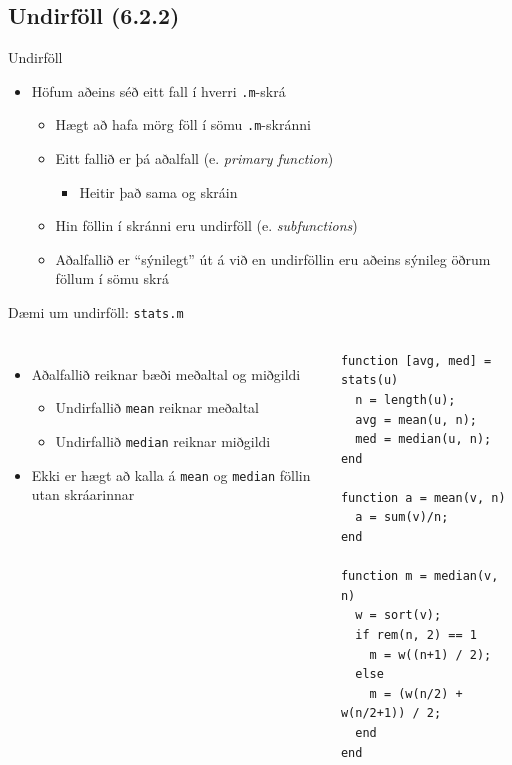 \documentclass[handout]{beamer}
\begin{document}
\subsection{Undirföll (6.2.2)}

\begin{frame}{Undirföll}
\begin{itemize}
 \item Höfum aðeins séð eitt fall í hverri \texttt{.m}-skrá
 \begin{itemize}
  \item Hægt að hafa mörg föll í sömu \texttt{.m}-skránni
  \item Eitt fallið er þá aðalfall (e. \emph{primary function})
  \begin{itemize}
   \item Heitir það sama og skráin
  \end{itemize}
  \item Hin föllin í skránni eru undirföll (e. \emph{subfunctions})
  \item Aðalfallið er ``sýnilegt'' út á við en undirföllin eru aðeins sýnileg öðrum föllum í sömu skrá
 \end{itemize}
\end{itemize}
\end{frame}

\begin{frame}[fragile]{Dæmi um undirföll: \texttt{stats.m}}
\begin{columns}
\begin{itemize}
 \item Aðalfallið reiknar bæði meðaltal og miðgildi
 \begin{itemize}
  \item Undirfallið \texttt{mean} reiknar meðaltal
  \item Undirfallið \texttt{median} reiknar miðgildi
 \end{itemize}
 \item Ekki er hægt að kalla á \texttt{mean} og \texttt{median} föllin utan skráarinnar
\end{itemize}

\begin{verbatim}
function [avg, med] = stats(u)
  n = length(u);
  avg = mean(u, n);
  med = median(u, n);
end

function a = mean(v, n)
  a = sum(v)/n;
end

function m = median(v, n)
  w = sort(v);
  if rem(n, 2) == 1
    m = w((n+1) / 2);
  else
    m = (w(n/2) + w(n/2+1)) / 2;
  end
end
\end{verbatim}
\end{columns}
\end{frame}
\end{document}
